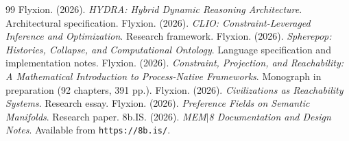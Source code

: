 \documentclass[11pt, oneside]{book}
\theoremstyle{definition}
\theoremstyle{remark}
\begin{document}
\begin{thebibliography}{99}
 Flyxion. (2026). \textit{HYDRA: Hybrid Dynamic Reasoning Architecture}. Architectural specification.
 Flyxion. (2026). \textit{CLIO: Constraint-Leveraged Inference and Optimization}. Research framework.
 Flyxion. (2026). \textit{Spherepop: Histories, Collapse, and Computational Ontology}. Language specification and implementation notes.
 Flyxion. (2026). \textit{Constraint, Projection, and Reachability: A Mathematical Introduction to Process-Native Frameworks}. Monograph in preparation (92 chapters, 391 pp.).
 Flyxion. (2026). \textit{Civilizations as Reachability Systems}. Research essay.
 Flyxion. (2026). \textit{Preference Fields on Semantic Manifolds}. Research paper.
 8b.IS. (2026). \textit{MEM$|$8 Documentation and Design Notes}. Available from \texttt{https://8b.is/}.

\end{thebibliography}
\end{document}
